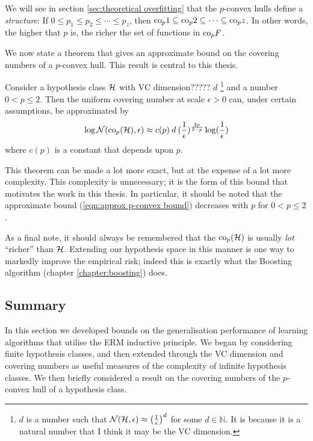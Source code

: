 We will see in section \ref{sec:theoretical overfitting} that the
$p$-convex hulls define a \emph{structure}:  If $0 \leq p_1 \leq p_2
\leq \cdots \leq p_z$, then $\mathrm{co}_p 1 \subseteq \mathrm{co}_p 2 \subseteq \cdots
\subseteq \mathrm{co}_p z$.  In other words, the higher that $p$ is, the richer
the set of functions in $\mathrm{co}_p{F}$.

We now state a theorem that gives an approximate bound on the covering
numbers of a $p$-convex hull.  This result is central to this thesis.

\begin{theorem}
Consider a hypothesis class $\mathcal{H}$ with VC dimension????? $d$
\footnote{$d$ is a number such that $\mathcal{N}({\mathcal{H}}, {\epsilon}) \approx
\left( \frac{1}{\epsilon} \right) ^ d$ for some $d \in \mathbb{N}$.
It is because it is a natural number that I think it may be the VC
dimension.}
and a number $0 < p \leq 2$.  Then the uniform covering number at scale
$\epsilon > 0$ can, under certain assumptions, be approximated by
%
\begin{equation}
\label{eqn:approx p-convex bound}
\log \mathcal{N}({\mathrm{co}_p(\mathcal{H})}, {\epsilon}) \approx c(p) \: d \: (\frac{1}
{\epsilon})^{\frac{2p}{2-p}} \log (\frac{1}{\epsilon})
\end{equation}
%
where $c(p)$ is a constant that depends upon $p$.
\end{theorem}

This theorem can be made a lot more exact, but at the expense of a lot
more complexity.  This complexity is unnecessary; it is the form of
this bound that motivates the work in this thesis.  In particular, it
should be noted that the approximate bound (\ref{eqn:approx p-convex
bound}) decreases with $p$ for $0 < p \leq 2$.

As a final note, it should always be remembered that the
$\mathrm{co}_{p}(\mathcal{H})$ is usually \emph{lot} ``richer'' than $\mathcal{H}$.
Extending our hypothesis space in this manner is one way to markedly
improve the empirical risk; indeed this is exactly what the Boosting
algorithm (chapter \ref{chapter:boosting}) does.


\subsection{Summary}

In this section we developed bounds on the generalisation performance
of learning algorithms that utilise the ERM inductive principle.  We
began by considering finite hypothesis classes, and then extended
through the VC dimension and covering numbers as useful measures of
the complexity of infinite hypothesis classes.  We then briefly
considered a result on the covering numbers of the $p$-convex hull of
a hypothesis class.


